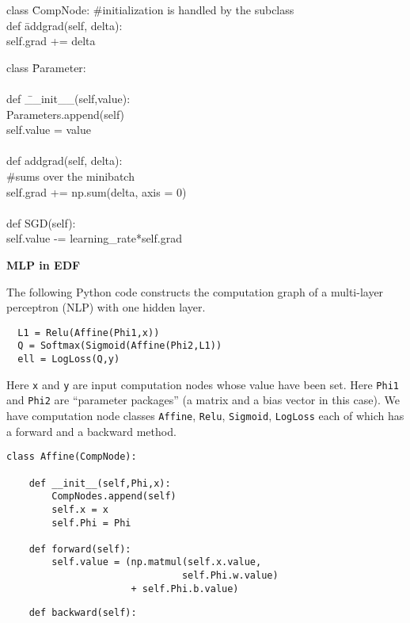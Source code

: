 \documentclass[landscape]{article}
\newcommand{\slide}[1]{
  \vfill
  \centerline{\Large\thepage}
  \eject
  \centerline{\bf #1}
  \vfill}
\newcommand{\anaslide}[1]{
  \vfill
  \centerline{\Large\thepage}
  \eject \centerline{\bf #1}}
\begin{document}
{\vfill
\begin{tabbing}
class \=CompNode: \#initialization is handled by the subclass \\
   \>def \=addgrad(self, delta): \\
   \>\>self.grad += delta
\end{tabbing}

\slide{}

\begin{tabbing}
class \=Parameter: \\
    \\
    \>def \=\_\_init\_\_(self,value): \\
        \>\>Parameters.append(self) \\
        \>\>self.value = value \\
\\
    \>def \>addgrad(self, delta): \\
          \>\>\#sums over the minibatch \\
    \>\>self.grad += np.sum(delta, axis = 0) \\
    \\
    \>def \>SGD(self): \\
    \>\>self.value -= learning\_rate*self.grad
\end{tabbing}

\anaslide{MLP in EDF}
\medskip

The following Python code constructs the computation graph of a multi-layer perceptron (NLP) with one hidden layer.

\vfill
\begin{verbatim}
  L1 = Relu(Affine(Phi1,x))
  Q = Softmax(Sigmoid(Affine(Phi2,L1))
  ell = LogLoss(Q,y)
\end{verbatim}

\vfill
Here {\tt x} and {\tt y} are input computation nodes
whose value have been set.
Here {\tt Phi1} and {\tt Phi2} are ``parameter packages'' (a matrix and a bias vector in this case).
We have computation node classes {\tt Affine}, {\tt Relu}, {\tt Sigmoid}, {\tt LogLoss} each of which has
a forward and a backward method.

\vfill
\eject
\begin{verbatim}
class Affine(CompNode):

    def __init__(self,Phi,x):
        CompNodes.append(self)
        self.x = x
        self.Phi = Phi

    def forward(self):
        self.value = (np.matmul(self.x.value,
                               self.Phi.w.value)
                      + self.Phi.b.value)
\end{verbatim}
\vfill
\eject
\vfill
\begin{verbatim}
    def backward(self):


\end{verbatim}}
\end{document}
